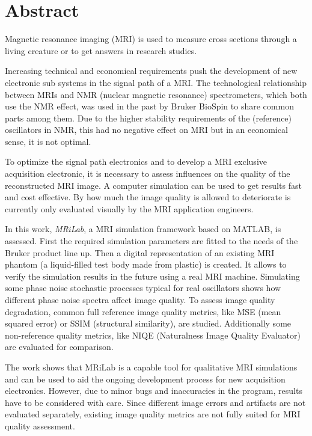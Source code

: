\chapter*{Abstract}
\thispagestyle{empty}
Magnetic resonance imaging (MRI) is used to measure cross sections through a living creature or to get answers in research studies.

Increasing technical and economical requirements push the development of new electronic sub systems in the signal path of a MRI. The technological relationship between MRIs and NMR (nuclear magnetic resonance) spectrometers, which both use the NMR effect, was used in the past by Bruker BioSpin to share common parts among them.
Due to the higher stability requirements of the (reference) oscillators in NMR, this had no negative effect on MRI but in an economical sense, it is not optimal.

To optimize the signal path electronics and to develop a MRI exclusive acquisition electronic, it is necessary to assess influences on the quality of the reconstructed MRI image. A computer simulation can be used to get results fast and cost effective. By how much the image quality is allowed to deteriorate is currently only evaluated visually by the MRI application engineers.

In this work, \textit{MRiLab}, a MRI simulation framework based on MATLAB, is assessed. First the required simulation parameters are fitted to the needs of the Bruker product line up. Then a digital representation of an existing MRI phantom (a liquid-filled test body made from plastic) is created. It allows to verify the simulation results in the future using a real MRI machine.
Simulating some phase noise stochastic processes typical for real oscillators shows how different phase noise spectra affect image quality. To assess image quality degradation, common full reference image quality metrics, like MSE (mean squared error) or SSIM (structural similarity), are studied. Additionally some non-reference quality metrics, like NIQE (Naturalness Image Quality Evaluator) are evaluated for comparison.

The work shows that MRiLab is a capable tool for qualitative MRI simulations and can be used to aid the ongoing development process for new acquisition electronics. However, due to minor bugs and inaccuracies in the program, results have to be considered with care. Since different image errors and artifacts are not evaluated separately, existing image quality metrics are not fully suited for MRI quality assessment.

